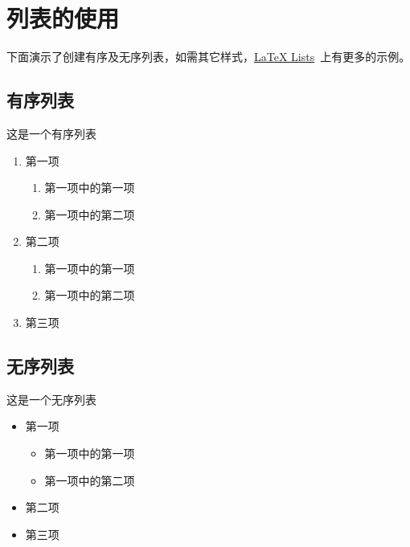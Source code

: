 \section{列表的使用}
下面演示了创建有序及无序列表，如需其它样式，\href{https://www.latex-tutorial.com/tutorials/lists/}{LaTeX Lists}~上有更多的示例。

\subsection{有序列表}
这是一个有序列表
  \begin{enumerate}
      \item 第一项
          \begin{enumerate}
              \item 第一项中的第一项
              \item 第一项中的第二项
          \end{enumerate}
      \item 第二项
    \begin{enumerate}[label=(\roman*)]
      \item 第一项中的第一项
      \item 第一项中的第二项
    \end{enumerate}
      \item 第三项
  \end{enumerate}

\subsection{无序列表}
  这是一个无序列表
  \begin{itemize}
      \item 第一项
      \begin{itemize}
          \item 第一项中的第一项
          \item 第一项中的第二项
      \end{itemize}
      \item 第二项
      \item 第三项
  \end{itemize}

